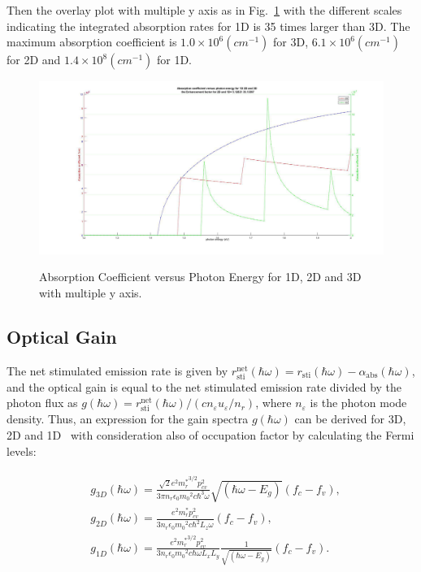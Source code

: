 Then the overlay plot with multiple y axis as in Fig.~\ref{absrate_overlay}
with the different scales indicating the integrated absorption rates for 1D is
35 times larger than 3D. The maximum absorption coefficient is $1.0\times10^{6}
(cm^{-1})$ for 3D, $6.1\times10^{6} (cm^{-1})$ for 2D and $1.4\times10^{8}
(cm^{-1})$ for 1D.

\begin{figure}
  \caption{Absorption Coefficient versus Photon Energy for 1D, 2D and 3D with multiple y axis.}
  \centering
  \includegraphics[width=\textwidth]{pictures/LT/absrate_overlay}
  \label{absrate_overlay}
\end{figure}

\subsection{Optical Gain}

The net stimulated emission rate is given by
$r_{\mathrm{sti}}^{\mathrm{net}}(\hbar\omega)=r_{\mathrm{sti}}(\hbar\omega)-\alpha_{\mathrm{abs}}(\hbar\omega)$,
and the optical gain is equal to the net stimulated emission rate divided by
the photon flux as
$g(\hbar\omega)=r_{\mathrm{sti}}^{\mathrm{net}}(\hbar\omega)/{(c{n_\varepsilon}u_\varepsilon/n_r)}$,
where $n_\varepsilon$ is the photon mode density. Thus, an expression for the
gain spectra $g(\hbar\omega)$ can be derived for 3D, 2D and
1D~\cite{coldren2012diode} with consideration also of occupation factor by
calculating the Fermi levels:

\begin{eqnarray}
\begin{aligned}
& g_{3D}(\hbar\omega)=\frac{\sqrt{2}e^2{m_r^\ast}^{3/2}{p_{cv}^2}}{3{\pi}n_r\epsilon_0{m_0}^2c{\hbar^3}\omega}{\sqrt{(\hbar\omega-E_g)}}(f_c-f_v),
\\
& g_{2D}(\hbar\omega)=\frac{e^2{m_r^\ast}{p_{cv}^2}}{3{n_r}\epsilon_0{m_0}^2c{\hbar^2}L_z\omega}(f_c-f_v),
\\
& g_{1D}(\hbar\omega)=\frac{e^2{m_r^\ast}^{3/2}{p_{cv}^2}}{3{n_r}\epsilon_0{m_0}^2c\hbar\omega{L_x}{L_y}}\frac{1}{\sqrt{(\hbar\omega-E_g)}}(f_c-f_v).
\end{aligned}
\label{eq:gainspectrum}
\end{eqnarray}

